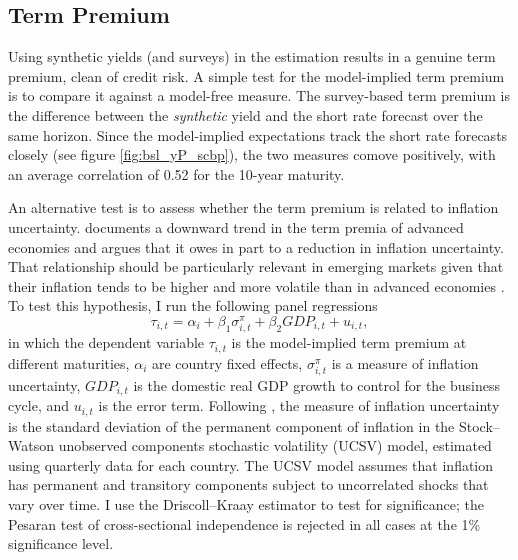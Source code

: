 \documentclass[a4paper, 12pt]{article}
\providecommand{\idxt}{t}
\providecommand{\idxi}{i}
\providecommand{\idxspnl}{\idxi,\idxt}
\newcommand{\eqpanelUCSV}{\tau_{\idxspnl} = \alpha_{\idxi} + \beta_{1} \sigma^{\pi}_{\idxspnl} + \beta_{2} GDP_{\idxspnl} + u_{\idxspnl}}
\begin{document}
\begin{appendices}
	\subsection{Term Premium} \label{sec:TP}
	Using synthetic yields (and surveys) in the estimation results in a genuine term premium, clean of credit risk. A simple test for the model-implied term premium is to compare it against a model-free measure. The survey-based term premium is the difference between the \textit{synthetic} yield and the short rate forecast over the same horizon. Since the model-implied expectations track the short rate forecasts closely (see figure \ref{fig:bsl_yP_scbp}), the two measures comove positively, with an average correlation of 0.52 for the 10-year maturity. %
	
	An alternative test is to assess whether the term premium is related to inflation uncertainty. \cite{Wright:2011} documents a downward trend in the term premia of advanced economies and argues that it owes in part to a reduction in inflation uncertainty. That relationship should be particularly relevant in emerging markets given that their inflation tends to be higher and more volatile than in advanced economies \citep{HaKoseOhnsorge:2019}. To test this hypothesis, I run the following panel regressions 
	\begin{equation*}
	\eqpanelUCSV ,
	\end{equation*}
	in which the dependent variable \(\tau_{\idxspnl}\) is the model-implied term premium at different maturities, \(\alpha_{\idxi}\) are country fixed effects, \(\sigma^{\pi}_{\idxspnl}\) is a measure of inflation uncertainty, \(GDP_{\idxspnl}\) is the domestic real GDP growth to control for the business cycle, and \(u_{\idxspnl}\) is the error term. Following \cite{Wright:2011}, the measure of inflation uncertainty is the standard deviation of the permanent component of inflation in the Stock--Watson unobserved components stochastic volatility (UCSV) model, estimated using quarterly data for each country. The UCSV model assumes that inflation has permanent and transitory components subject to uncorrelated shocks that vary over time. I use the Driscoll--Kraay estimator to test for significance; the Pesaran test of cross-sectional independence is rejected in all cases at the 1\% significance level. 
	

\end{appendices}
\end{document}
